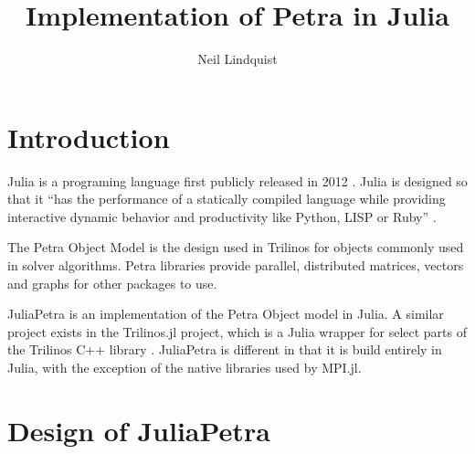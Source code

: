 \documentclass[acmsmall]{acmart}
\title{Implementation of Petra in Julia}
\author{Neil Lindquist}
\begin{document}
\maketitle

\section{Introduction}

Julia is a programing language first publicly released in 2012 \cite{WhyWeCreatedJulia}.
Julia is designed so that it
``has the performance of a statically compiled
language while providing interactive dynamic behavior and productivity like Python, LISP or
Ruby'' \cite{JuliaDesignPaper}.

The Petra Object Model is the design used in Trilinos for objects commonly used in solver algorithms.
\cite{OverviewOfTrilinos}
Petra libraries provide parallel, distributed matrices, vectors and graphs for other packages to use.

JuliaPetra is an implementation of the Petra Object model in Julia.
A similar project exists in the Trilinos.jl project, which is a Julia wrapper for select parts of
the Trilinos C++ library \cite{Trilinos.jlGithub}.
JuliaPetra is different in that it is build entirely in Julia, with the exception of the
native libraries used by MPI.jl.


\section{Design of JuliaPetra}
\end{document}
